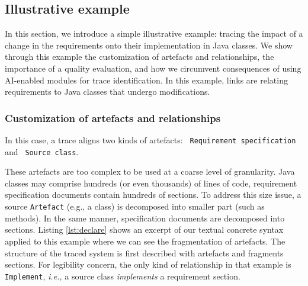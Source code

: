 \subsection{Illustrative example}


In this section, we introduce a simple illustrative example: tracing the impact of a change in the requirements onto their implementation in Java classes. We show through this example the customization of artefacts and relationships, the importance of a quality evaluation, and how we circumvent consequences of using AI-enabled modules for trace identification.
In this example, links are relating requirements to Java classes that undergo modifications. 

 
\subsubsection{Customization of artefacts and relationships}
In this case, a trace aligns two kinds of artefacts: 
\footnotesize\verb" Requirement specification " and \verb" Source class".
\normalsize

These artefacts are too complex to be used at a coarse level of granularity. Java classes may comprise hundreds (or even thousands) of lines of code, requirement specification documents contain hundreds of sections. To address this size issue, a source \texttt{Artefact} (e.g., a class) is decomposed into smaller part (such as methods). In the same manner, specification documents are decomposed into sections. Listing \ref{lst:declare} shows an excerpt of our textual concrete syntax applied to this example where we can see the fragmentation of artefacts. The structure of the traced system is first described with artefacts and fragments sections. For legibility concern, the only kind of relationship in that example is \texttt{Implement}, \textit{i.e.,} a source class \textit{implements} a requirement section. 


